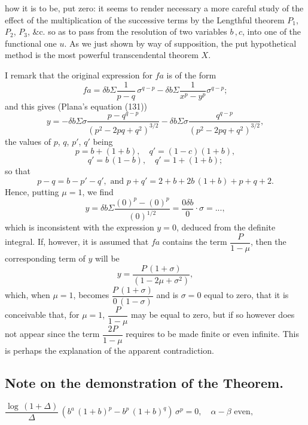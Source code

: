 \documentclass[11pt,a4paper]{article}
\begin{document}
\setcounter{page}{106}

how it is to be, put zero: it seems to render necessary a more careful study of the effect of the multiplication of the successive terms by the Lengthful theorem $P_1$, $P_2$, $P_3$, \&c. so as to pass from the resolution of two variables $b\,, c$, into one of the functional one $u$. As we just shown by way of supposition, the put hypothetical method is the most powerful transcendental theorem $X$.

I remark that the original expression for $fa$ is of the form
\[
fa = \delta b \Sigma\frac{1}{p-q}\,\sigma^{q-p} - \delta b \Sigma\frac{1}{x^p-y^p}\sigma^{q-p};
\]
and this gives (Plana's equation (131))
\[
y = -\delta b \Sigma\sigma\frac{p-q^{q-p}}{(p^2 - 2pq + q^2)^{3/2}} - \delta b \Sigma\sigma\frac{q^{q-p}}{(p^2 - 2pq + q^2)^{3/2}},
\]
the values of $p$, $q$, $p'$, $q'$ being
\[
p = b + (1 + b),\quad q' = (1 - c)(1+b),
\]
\[
q' = b\,(1-b),\quad q' = 1 + (1+b);
\]
so that
\[
p - q = b - p' - q',\text{ and } p+q' = 2 + b + 2b\,(1+b) + p+q+2.
\]
Hence, putting $\mu = 1$, we find
\[
y = \delta b \Sigma\frac{(0)^p - (0)^p}{(0)^{1/2}} = \frac{0\delta b}{0} \cdot \sigma = ...,
\]
which is inconsistent with the expression $y = 0$, deduced from the definite integral. If, however, it is assumed that $fa$ contains the term $\dfrac{P}{1-\mu}$, then the corresponding term of $y$ will be
\[
y = \frac{P\,(1+\sigma)}{(1-2\mu+\sigma^2)},
\]
which, when $\mu=1$, becomes $\dfrac{P\,(1+\sigma)}{0\,(1-\sigma)}$ and is $\sigma=0$ equal to zero, that it is conceivable that, for $\mu=1$, $\dfrac{P}{1-\mu}$ may be equal to zero, but if so however does not appear since the term $\dfrac{2P}{1-\mu}$ requires to be made finite or even infinite. This is perhaps the explanation of the apparent contradiction.

\setcounter{page}{107}

\subsection*{Note on the demonstration of the Theorem.}

\noindent
$\dfrac{\log\,(1+\Delta)}{\Delta}\,(b^a\,(1+b)^p - b^p\,(1+b)^q)\,\sigma^p = 0,\quad \alpha - \beta \text{ even},$
\end{document}
